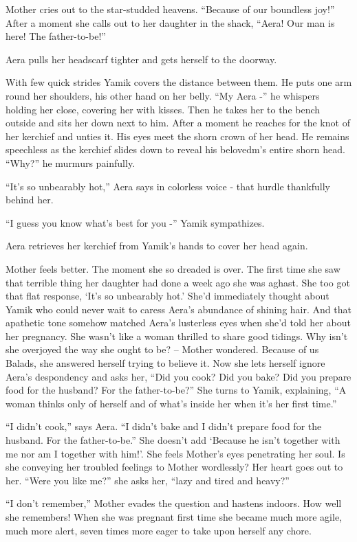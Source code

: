 \documentclass[twoside,11pt]{book}
\begin{document}
Mother cries out to the star-studded heavens. ``Because of our boundless joy!'' After a
moment she calls out to her daughter in the shack, ``Aera! Our man is here! The
father-to-be!''

Aera pulls her headscarf tighter and gets herself to the doorway.

With few quick strides Yamik covers the distance between them. He puts one arm round her shoulders, his other hand on
her belly. ``My Aera -'' he whispers holding her close, covering her with kisses. Then he
takes her to the bench outside and sits her down next to him. After a moment he reaches for the knot of her kerchief
and unties it. His eyes meet the shorn crown of her head. He remains speechless as the kerchief slides down to reveal
his belovedm's entire shorn head. ``Why?'' he murmurs painfully.

``It's so unbearably hot,'' Aera says in colorless voice - that hurdle thankfully behind her.

``I guess you know what's best for you -'' Yamik sympathizes.

Aera retrieves her kerchief from Yamik's hands to cover her head again.

Mother feels better. The moment she so dreaded is over. The first time she saw that terrible thing her daughter had done
a week ago she was aghast. She too got that flat response, `It's so unbearably hot.' She'd immediately thought about
Yamik who could never wait to caress Aera's abundance of shining hair. And that apathetic tone somehow matched Aera's
lusterless eyes when she'd told her about her pregnancy. She wasn't like a woman thrilled to share good tidings. Why
isn't she overjoyed the way she ought to be? -- Mother wondered. Because of us Balads, she answered herself trying to
believe it. Now she lets herself ignore Aera's despondency and asks her, ``Did you cook? Did you bake? Did
you prepare food for the husband? For the father-to-be?'' She turns to Yamik, explaining, ``A
woman thinks only of herself and of what's inside her when it's her first time.''

``I didn't cook,'' says Aera. ``I didn't bake and I didn't prepare food for the
husband. For the father-to-be.'' She doesn't add `Because he isn't together with me nor am I together with
him!'. She feels Mother's eyes penetrating her soul. Is she conveying her troubled feelings to Mother wordlessly? Her
heart goes out to her. ``Were you like me?'' she asks her, ``lazy and tired and heavy?''

``I don't remember,'' Mother evades the question and hastens indoors. How well she remembers!
When she was pregnant first time she became much more agile, much more alert, seven times more eager to take upon
herself any chore.
\end{document}
